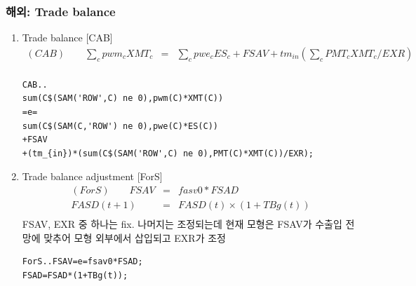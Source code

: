 \documentclass[10pt,compress,slidetop,%
			   hyperref={unicode},xcolor={svgnames},%
			   t]{beamer}
\begin{document}
\begin{frame}[fragile]
	\frametitle{해외: Trade balance}
\begin{small}
\begin{enumerate}
\item{Trade balance [CAB]}
\begin{eqnarray*}
(CAB)\qquad\sum_c pwm_c XMT_c &=&\sum_c pwe_cES_c+FSAV+tm_{in}(\sum_c PMT_cXMT_c/EXR)\\
\end{eqnarray*}

\begin{verbatim}
CAB..
sum(C$(SAM('ROW',C) ne 0),pwm(C)*XMT(C))
=e=
sum(C$(SAM(C,'ROW') ne 0),pwe(C)*ES(C))
+FSAV
+(tm_{in})*(sum(C$(SAM('ROW',C) ne 0),PMT(C)*XMT(C))/EXR);
\end{verbatim}
\item{Trade balance adjustment [ForS]}
\begin{eqnarray*}
(ForS)\qquad FSAV&=&fasv0*FSAD\\
FASD(t+1)&=&FASD(t)\times(1+TBg(t))\\
\end{eqnarray*}
FSAV, EXR 중 하나는 fix. 나머지는 조정되는데 현재 모형은 FSAV가 수출입 전망에 맞추어 모형 외부에서 삽입되고 EXR가 조정
\begin{verbatim}
ForS..FSAV=e=fsav0*FSAD; 
FSAD=FSAD*(1+TBg(t));
\end{verbatim} 
\end{enumerate}
\end{small}
\end{frame}


\end{document}
